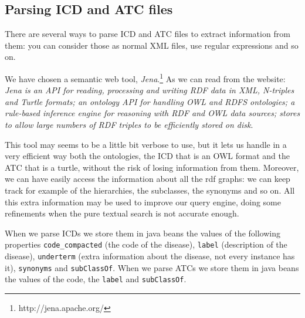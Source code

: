 \documentclass{article}
\begin{document}
\subsection{Parsing ICD and ATC files}

There are several ways to parse ICD and ATC files to extract information from them: you can consider those as normal XML files, use regular expressions and so on.

We have chosen a semantic web tool, \emph{Jena}.\footnote{http://jena.apache.org/} As we can read from the website: \emph{Jena is an API for reading, processing and writing RDF data in XML, N-triples and Turtle formats; an ontology API for handling OWL and RDFS ontologies; a rule-based inference engine for reasoning with RDF and OWL data sources; stores to allow large numbers of RDF triples to be efficiently stored on disk}. 

This tool may seems to be a little bit verbose to use, but it lets us handle in a very efficient way both the ontologies, the ICD that is an OWL format and the ATC that is a turtle, without the risk of losing information from them. Moreover, we can have easily access the information about all the rdf graphs: we can keep track for example of the hierarchies, the subclasses, the synonyms and so on. All this extra information may be used to improve our query engine, doing some refinements when the pure textual search is not accurate enough.

When we parse ICDs we store them in java beans the values of the following properties \texttt{code\_compacted} (the code of the disease), \texttt{label} (description of the disease), \texttt{underterm} (extra information about the disease, not every instance has it), \texttt{synonyms} and \texttt{subClassOf}.
When we parse ATCs we store them in java beans the values of the code, the \texttt{label} and \texttt{subClassOf}.
\end{document}
